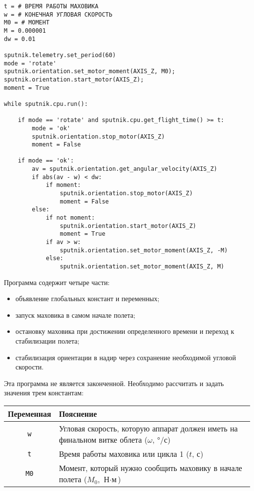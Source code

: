\documentclass[12pt,a4paper]{article}
\begin{document}
\begin{verbatim}
t = # ВРЕМЯ РАБОТЫ МАХОВИКА
w = # КОНЕЧНАЯ УГЛОВАЯ СКОРОСТЬ
M0 = # МОМЕНТ
M = 0.000001
dw = 0.01

sputnik.telemetry.set_period(60)
mode = 'rotate'
sputnik.orientation.set_motor_moment(AXIS_Z, M0);
sputnik.orientation.start_motor(AXIS_Z);
moment = True

while sputnik.cpu.run():

    if mode == 'rotate' and sputnik.cpu.get_flight_time() >= t: 
        mode = 'ok'
        sputnik.orientation.stop_motor(AXIS_Z)
        moment = False

    if mode == 'ok':
        av = sputnik.orientation.get_angular_velocity(AXIS_Z)
        if abs(av - w) < dw:
            if moment:
                sputnik.orientation.stop_motor(AXIS_Z)
                moment = False
        else:
            if not moment:
                sputnik.orientation.start_motor(AXIS_Z)
                moment = True
            if av > w:
                sputnik.orientation.set_motor_moment(AXIS_Z, -M)
            else:
                sputnik.orientation.set_motor_moment(AXIS_Z, M)
\end{verbatim}

Программа содержит четыре части:

\begin{itemize}
\item объявление глобальных констант и переменных;
\item запуск маховика в самом начале полета;
\item остановку маховика при достижении определенного времени и переход к стабилизации полета;
\item стабилизация ориентации в надир через сохранение необходимой угловой скорости.
\end{itemize}
  
Эта программа не является законченной. Необходимо рассчитать и задать значения трем
константам:

\begin{center}
\begin{tabular}{ |c|p{12cm}|} 
  \hline
  \textbf{Переменная} & \textbf{Пояснение} \\
  \hline
  \verb'w' & Угловая скорость, которую аппарат должен иметь на финальном витке облета
  ($\omega$, °/с)\\
  \hline
  \verb't' & Время работы маховика или цикла 1 ($t$, с)\\
  \hline
  \verb'M0' & Момент, который нужно сообщить маховику в начале полета ($M_0$, $\text{Н}
  \cdot \text{м}$)\\
  \hline
\end{tabular}
\end{center}
\end{document}
